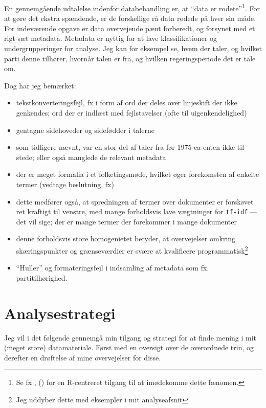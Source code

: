 En gennemgående udtalelse indenfor databehandling er, at “data er rodete”\footnote{Se fx \citeauthor{wickhamTidyData2014}, (\citeyear{wickhamTidyData2014}) for en R-centreret tilgang til at imødekomme dette fænomen.}.
For at gøre det ekstra spændende, er de forskellige rå data rodede på hver sin måde.
For indeværende opgave er data overvejende pænt forberedt, og forsynet med et rigt sæt metadata.
Metadata er nyttig for at lave klassifikationer og undergrupperinger for analyse.
Jeg kan for eksempel se, hvem der taler, og hvilket parti denne tilhører, hvornår talen er fra, og hvilken regeringsperiode det er tale om.

Dog har jeg bemærket:
\begin{itemize}
  \item
    tekstkonverteringsfejl, fx i form af ord der deles over linjeskift der ikke genkendes; ord der er indlæst med fejlstavelser (ofte til uigenkendelighed)
  \item
    gentagne sidehoveder og sidefødder i talerne
  \item
    som tidligere nævnt, var en stor del af taler fra før 1975 ca enten ikke til stede; eller også manglede de relevant metadata
  \item
    der er meget formalia i et folketingsmøde, hvilket øger forekomsten af enkelte termer (vedtage beslutning, fx)
  \item
    dette medfører også, at spredningen af termer over dokumenter er forskøvet ret kraftigt til venstre, med mange forholdsvis lave vægtninger for \texttt{tf-idf} — det vil sige; der er mange termer der forekommer i mange dokumenter
  \item
    denne forholdsvis store homogenietet betyder, at overvejelser omkring skæringspunkter og grænseværdier er svære at kvalificere programmatisk\footnote{Jeg uddyber dette med eksempler i mit analyseafsnit}
  \item
    “Huller” og formateringsfejl i indsamling af metadata som fx. partitilhørighed.
\end{itemize}

\chapter{Analysestrategi}\label{chap:strategy}

Jeg vil i det følgende gennemgå min tilgang og strategi for at finde mening i mit (meget store) datamateriale.
Først med en oversigt over de overordnede trin, og derefter en drøftelse af mine overvejelser for disse. 

